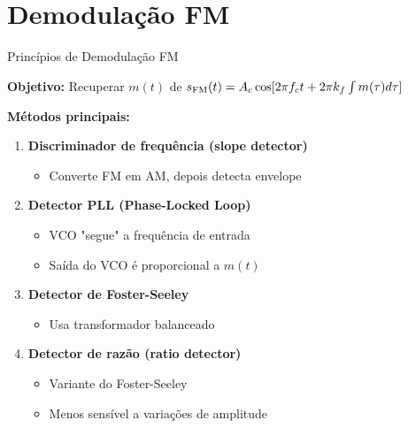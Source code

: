 
\section{Demodulação FM}

\begin{frame}{Princípios de Demodulação FM}

\textbf{Objetivo:} Recuperar $m(t)$ de $s_{\text{FM}}(t) = A_c \cos[2\pi f_c t + 2\pi k_f \int m(\tau)d\tau]$

\vspace{0.3cm}

\textbf{Métodos principais:}

\begin{enumerate}
\item \textbf{Discriminador de frequência (slope detector)}
   \begin{itemize}
   \item Converte FM em AM, depois detecta envelope
   \end{itemize}

\item \textbf{Detector PLL (Phase-Locked Loop)}
   \begin{itemize}
   \item VCO "segue" a frequência de entrada
   \item Saída do VCO é proporcional a $m(t)$
   \end{itemize}

\item \textbf{Detector de Foster-Seeley}
   \begin{itemize}
   \item Usa transformador balanceado
   \end{itemize}

\item \textbf{Detector de razão (ratio detector)}
   \begin{itemize}
   \item Variante do Foster-Seeley
   \item Menos sensível a variações de amplitude
   \end{itemize}
\end{enumerate}

\end{frame}


